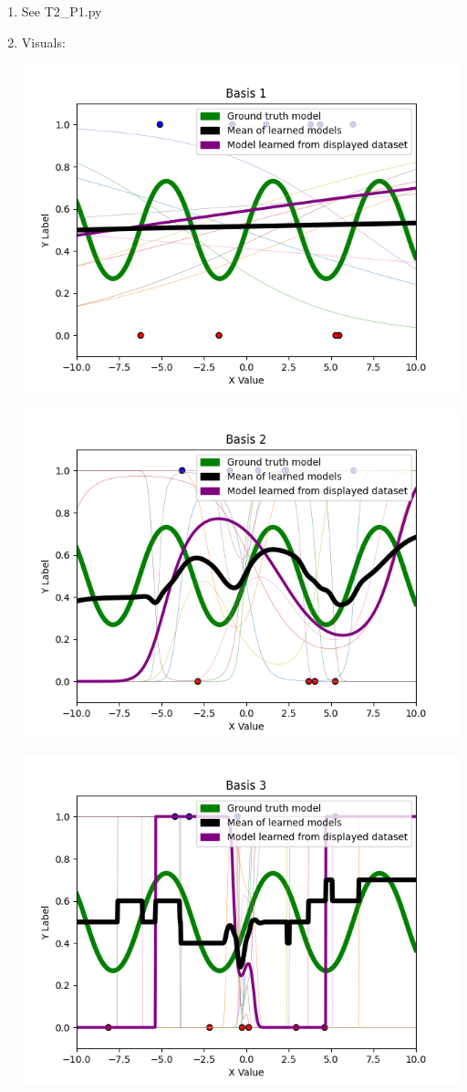 \documentclass[submit]{harvardml}
\begin{document}
\begin{enumerate}
    \item See T2\_P1.py
    \item 
Visuals:

\includegraphics[width=.7\textwidth]{Basis 1.png}

\includegraphics[width=.7\textwidth]{Basis 2.png}

\includegraphics[width=.7\textwidth]{Basis 3.png}


\end{enumerate}
\end{document}
